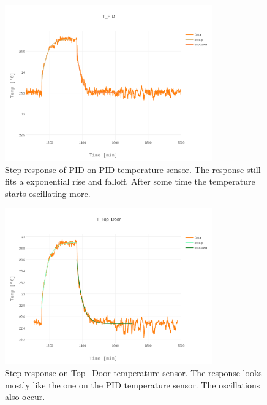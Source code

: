\documentclass[12pt]{scrartcl}
\begin{document}
      \begin{figure}[H]
        \centering
        \includegraphics[width = 0.8\textwidth]{./plots/plot_image(16)}
        \caption{Step response of PID on PID temperature sensor. The response still
        fits a exponential rise and falloff. After some time the temperature
        starts oscillating more.}
        \label{fig15}
      \end{figure}
      \begin{figure}[H]
        \centering
        \includegraphics[width = 0.8\textwidth]{./plots/plot_image(17)}
        \caption{Step response on Top\_Door temperature sensor. The response looks
        mostly like the one on the PID temperature sensor. The oscillations also
        occur.}
        \label{fig16}
      \end{figure}
      \clearpage
\end{document}
